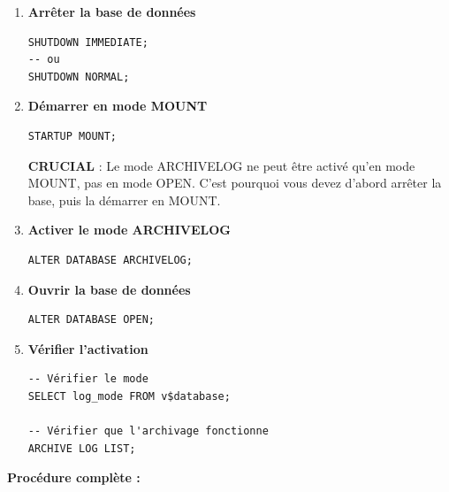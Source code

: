 \documentclass[11pt,a4paper]{article}
\begin{document}
\begin{enumerate}
    \item \textbf{Arrêter la base de données}
    \begin{commandebox}
\begin{lstlisting}
SHUTDOWN IMMEDIATE;
-- ou
SHUTDOWN NORMAL;
\end{lstlisting}
    \end{commandebox}
    
    \item \textbf{Démarrer en mode MOUNT}
    \begin{commandebox}
\begin{lstlisting}
STARTUP MOUNT;
\end{lstlisting}
    \end{commandebox}
    
    \begin{importantbox}
    \textbf{CRUCIAL} : Le mode ARCHIVELOG ne peut être activé qu'en mode MOUNT, pas en mode OPEN. C'est pourquoi vous devez d'abord arrêter la base, puis la démarrer en MOUNT.
    \end{importantbox}
    
    \item \textbf{Activer le mode ARCHIVELOG}
    \begin{commandebox}
\begin{lstlisting}
ALTER DATABASE ARCHIVELOG;
\end{lstlisting}
    \end{commandebox}
    
    \item \textbf{Ouvrir la base de données}
    \begin{commandebox}
\begin{lstlisting}
ALTER DATABASE OPEN;
\end{lstlisting}
    \end{commandebox}
    
    \item \textbf{Vérifier l'activation}
    \begin{commandebox}
\begin{lstlisting}
-- Vérifier le mode
SELECT log_mode FROM v$database;

-- Vérifier que l'archivage fonctionne
ARCHIVE LOG LIST;
\end{lstlisting}
    \end{commandebox}
\end{enumerate}

\textbf{Procédure complète :}
\end{document}
